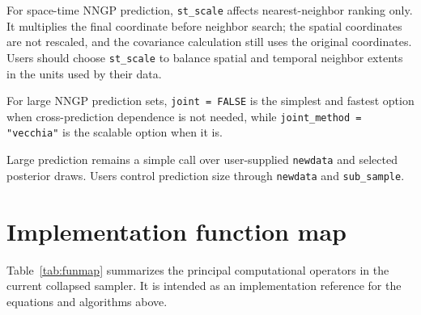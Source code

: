 \documentclass[11pt]{article}
\begin{document}
For space-time NNGP prediction, \texttt{st\_scale} affects nearest-neighbor ranking only. It multiplies the final coordinate before neighbor search; the spatial coordinates are not rescaled, and the covariance calculation still uses the original coordinates. Users should choose \texttt{st\_scale} to balance spatial and temporal neighbor extents in the units used by their data.

For large NNGP prediction sets, \texttt{joint = FALSE} is the simplest and fastest option when cross-prediction dependence is not needed, while \texttt{joint\_method = "vecchia"} is the scalable option when it is.

Large prediction remains a simple call over user-supplied \texttt{newdata} and selected posterior draws. Users control prediction size through \texttt{newdata} and \texttt{sub\_sample}.

\section{Implementation function map}

Table~\ref{tab:funmap} summarizes the principal computational operators in the current collapsed sampler. It is intended as an implementation reference for the equations and algorithms above.
\end{document}
